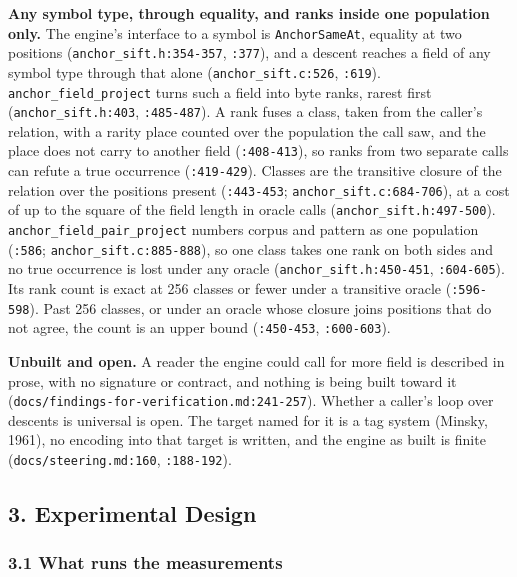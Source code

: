 \noindent\textbf{Any symbol type, through equality, and ranks inside one population only.} The engine's interface to a symbol is \texttt{AnchorSameAt}, equality at two positions (\texttt{anchor\_sift.h:354-357}, \texttt{:377}), and a descent reaches a field of any symbol type through that alone (\texttt{anchor\_sift.c:526}, \texttt{:619}). \texttt{anchor\_field\_project} turns such a field into byte ranks, rarest first (\texttt{anchor\_sift.h:403}, \texttt{:485-487}). A rank fuses a class, taken from the caller's relation, with a rarity place counted over the population the call saw, and the place does not carry to another field (\texttt{:408-413}), so ranks from two separate calls can refute a true occurrence (\texttt{:419-429}). Classes are the transitive closure of the relation over the positions present (\texttt{:443-453}; \texttt{anchor\_sift.c:684-706}), at a cost of up to the square of the field length in oracle calls (\texttt{anchor\_sift.h:497-500}). \texttt{anchor\_field\_pair\_project} numbers corpus and pattern as one population (\texttt{:586}; \texttt{anchor\_sift.c:885-888}), so one class takes one rank on both sides and no true occurrence is lost under any oracle (\texttt{anchor\_sift.h:450-451}, \texttt{:604-605}). Its rank count is exact at 256 classes or fewer under a transitive oracle (\texttt{:596-598}). Past 256 classes, or under an oracle whose closure joins positions that do not agree, the count is an upper bound (\texttt{:450-453}, \texttt{:600-603}).

\noindent\textbf{Unbuilt and open.} A reader the engine could call for more field is described in prose, with no signature or contract, and nothing is being built toward it (\texttt{docs/\allowbreak{}findings-\allowbreak{}for-\allowbreak{}verification.md:241-\allowbreak{}257}). Whether a caller's loop over descents is universal is open. The target named for it is a tag system (Minsky, 1961), no encoding into that target is written, and the engine as built is finite (\texttt{docs/\allowbreak{}steering.md:160}, \texttt{:188-\allowbreak{}192}).

\subsection{3. Experimental Design}

\subsubsection{3.1 What runs the measurements}

